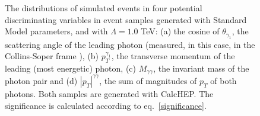 \begin{figure}[htp]
\begin{minipage}[b]{.499\textwidth}
\begin{infilsf}\tiny
\hspace{-.9em}\makebox[.96\textwidth]{}
\end{infilsf}
\vspace{-1em}
\end{minipage}
\hfill
\begin{minipage}[b]{.499\textwidth}
\begin{infilsf} \tiny
\makebox[.96\textwidth]{}
\end{infilsf}
\vspace{-1em}
\end{minipage}

\vspace{1em}

\noindent
\begin{minipage}[b]{.499\textwidth}
\begin{infilsf} \tiny
\hspace{-.2em}\makebox[.96\textwidth]{ }
\end{infilsf}
\vspace{-1em}
\end{minipage}\hfill
\begin{minipage}[b]{.499\textwidth}
\begin{infilsf} \tiny
\makebox[.96\textwidth]{}
\end{infilsf}
\vspace{-1em}
\end{minipage}
\begin{minipage}[t]{\textwidth}
\caption{The distributions of simulated events in four potential discriminating variables in event samples generated with Standard Model parameters, and with $\Lambda = 1.0$ TeV: (a) the cosine of $\theta_{\gamma_1}$, the scattering angle of the leading photon (measured, in this case, in the Collins-Soper frame \cite{collinssoper}), (b) $p_T^{\gamma_1}$, the transverse momentum of the leading (most energetic) photon, (c) $M_{\gamma\gamma}$, the invariant mass of the photon pair and (d) $|p_T|^{\gamma\gamma}$, the sum of magnitudes of $p_T$ of both photons. Both samples are generated with CalcHEP. The significance is calculated according to eq.~\eqref{significance}.
\label{discr}}
\end{minipage}
\end{figure}


